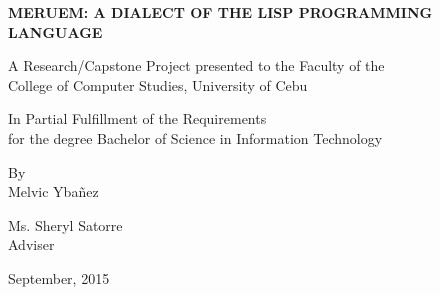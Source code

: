 \begin{titlepage}
	\begin{center}
		\vspace*{1cm}
		\large
		\uppercase{\textbf{MERUEM: A dialect of the Lisp programming language}}

		\vfill
		A Research/Capstone Project presented to the Faculty of the\\
		College of Computer Studies, University of Cebu
		
		\vfill
		In Partial Fulfillment of the Requirements\\
		for the degree Bachelor of Science in Information Technology
		
		\vfill
		By\\
		Melvic Ybañez
		
		\vfill
		Ms. Sheryl Satorre\\
		Adviser
		
		\vfill
		September, 2015
		
		\vspace*{1cm}
	\end{center}
\end{titlepage}